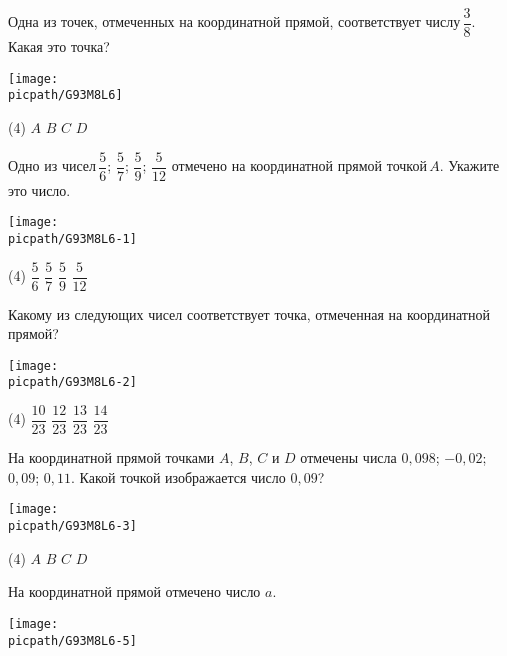\begin{class}[number=6]
	\begin{listofex}
		\item Одна из точек, отмеченных на координатной прямой, соответствует числу \( \dfrac{3}{8} \).  Какая это точка?
		\begin{center}
			\texttt{[image: \\picpath/G93M8L6]}
		\end{center}
		\begin{tasks}(4)
			\task \( A \)
			\task \( B \)
			\task \( C \)
			\task \( D \)
		\end{tasks}
		\item Одно из чисел \( \dfrac{5}{6} \); \( \dfrac{5}{7} \); \( \dfrac{5}{9} \); \( \dfrac{5}{12} \) отмечено на координатной прямой точкой \( A \). Укажите это число.
		\begin{center}
			\texttt{[image: \\picpath/G93M8L6-1]}
		\end{center}
		\begin{tasks}(4)
			\task \( \dfrac{5}{6} \)
			\task \( \dfrac{5}{7} \)
			\task \( \dfrac{5}{9} \)
			\task \( \dfrac{5}{12} \)
		\end{tasks}
		\item Какому из следующих чисел соответствует точка, отмеченная на координатной прямой?
		\begin{center}
			\texttt{[image: \\picpath/G93M8L6-2]}
		\end{center}
		\begin{tasks}(4)
			\task \( \dfrac{10}{23} \)
			\task \( \dfrac{12}{23} \)
			\task \( \dfrac{13}{23} \)
			\task \( \dfrac{14}{23} \)
		\end{tasks}
		\item На координатной прямой точками \( A \), \( B \), \( C \) и \( D \) отмечены числа \( 0,098 \); \( -0,02 \); \( 0,09 \); \( 0,11 \). Какой точкой изображается число \( 0,09 \)?
		\begin{center}
			\texttt{[image: \\picpath/G93M8L6-3]}
		\end{center}
		\begin{tasks}(4)
			\task \( A \)
			\task \( B \)
			\task \( C \)
			\task \( D \)
		\end{tasks}
		\item На координатной прямой отмечено число \( a \).
		\begin{center}
			\texttt{[image: \\picpath/G93M8L6-5]}

\end{center}
\end{listofex}
\end{class}
